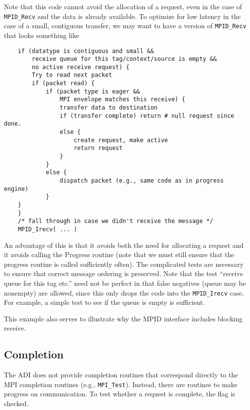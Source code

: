 \documentclass{article}
\def\code#1{\texttt{#1}}
\begin{document}
Note that this code cannot avoid the allocation of a request, even in
the case of \code{MPID_Recv} and the data is already available.  To
optimize for low latency in the case of a small, contiguous transfer,
we may want to have a version of \code{MPID_Recv} that looks something
like
\begin{verbatim}
    if (datatype is contiguous and small &&
        receive queue for this tag/context/source is empty &&
        no active receive request) {
        Try to read next packet
        if (packet read) {
            if (packet type is eager &&
                MPI envelope matches this receive) {
                transfer data to destination
                if (transfer complete) return # null request since done.
                else {
                    create request, make active
                    return request
                }
            }
            else {
                dispatch packet (e.g., same code as in progress engine)
            }
	} 
    }
    /* fall through in case we didn't receive the message */
    MPID_Irecv( ... )
\end{verbatim}
An advantage of this is that it avoids both the need for allocating a
request and it avoids calling the Progress routine (note that we must
still ensure that the progress routine is called sufficiently often).
The complicated tests are necessary to ensure that correct message
ordering is preserved. Note that the test ``receive queue for this tag
etc.'' need not be perfect in that false negatives (queue may be
nonempty) are allowed, since this only drops the code into the
\code{MPID_Irecv} case.  For example, a simple test to see if the
queue is empty is sufficient.

This example also serves to illustrate why the MPID interface includes
blocking receive.

\subsection{Completion}
The ADI does not provide completion routines that correspond directly
to the MPI completion routines (e.g., \code{MPI_Test}).  Instead,
there are routines to make progress on communication.  To test whether
a request is complete, the  flag is checked.
\end{document}
